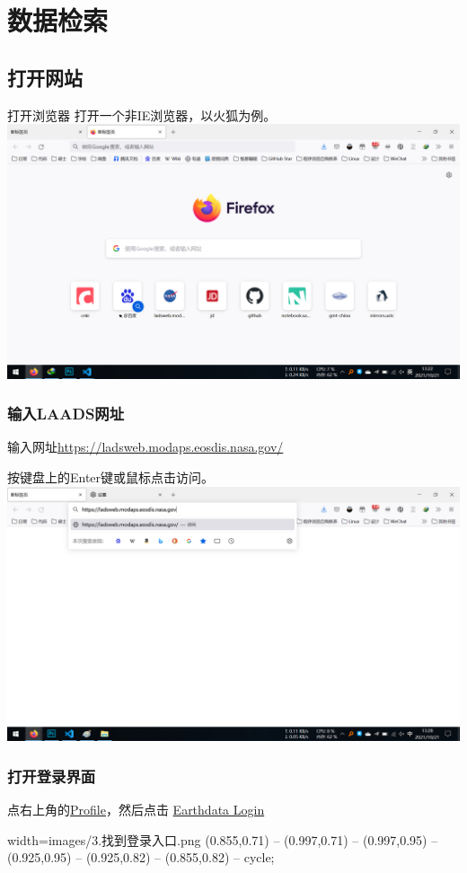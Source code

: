 \section{数据检索}
\subsection{打开网站}
\begin{frame}{打开浏览器}
    打开一个非IE浏览器，以火狐为例。
    \includegraphics[width=\linewidth]{images/1.打开浏览器.png}
\end{frame}
\begin{frame}
    \frametitle{输入LAADS网址}
    输入网址\url{https://ladsweb.modaps.eosdis.nasa.gov/}

    按键盘上的Enter键或鼠标点击访问。
    \includegraphics[width=\linewidth]{images/2.输入LAADS网址.png}
\end{frame}
\begin{frame}
    \frametitle{打开登录界面}
    点右上角的\underline{Profile}，然后点击 \underline{Earthdata Login}
    \begin{annotationimage}{width=\linewidth}{images/3.找到登录入口.png}
         (0.855,0.71) -- (0.997,0.71) -- (0.997,0.95) --
        (0.925,0.95) -- (0.925,0.82) -- (0.855,0.82) -- cycle;
    \end{annotationimage}
\end{frame}
